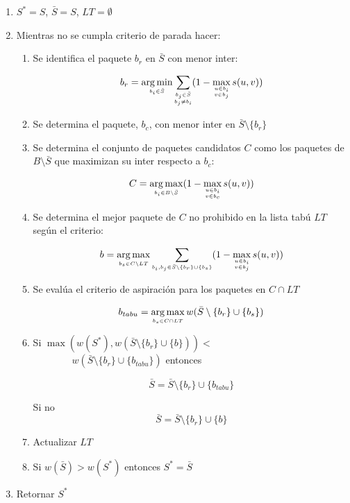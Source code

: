 \begin{enumerate}
\item $S^* = S$, $ \bar{S}= S$, $LT = \emptyset$

\item Mientras no se cumpla criterio de parada hacer:

\begin{enumerate}
      	
\item Se identifica el paquete $b_r$ en $\bar{S}$ con menor inter:

$$b_r = \operatorname*{arg\,min}_{\scriptscriptstyle b_i \in \bar{S}} \sum_{\substack{\scriptscriptstyle  b_j \in \bar{S} \\ \scriptscriptstyle  b_j \ne b_i}} (1-\max_{\substack{\scriptscriptstyle  u\in b_i \\ \scriptscriptstyle v \in b_j}} s(u,v))$$

\item Se determina el paquete, $b_c$, con menor inter en $\bar{S} \setminus \{b_r\}$
	
\item Se determina el conjunto de paquetes candidatos $C$ como los paquetes de $B\setminus \bar{S}$ que maximizan su inter respecto a $b_c$:

$$C = \operatorname*{arg\,max}_{\scriptscriptstyle b_i \in B \setminus \bar{S}} (1-\max_{\substack{\scriptscriptstyle u\in b_i \\ \scriptscriptstyle v \in b_c}} s(u,v))$$

\item Se determina el mejor paquete de $C$ no prohibido en la lista tabú $LT$ según el criterio:

$$b = \operatorname*{arg\,max}_{\scriptscriptstyle b_s \in C \setminus LT} \sum_{\scriptscriptstyle b_i, b_j \in \bar{S}\setminus \{b_r\} \cup \{b_s\}}(1-\max_{\substack{\scriptscriptstyle u\in b_i \\ \scriptscriptstyle v \in b_j}} s(u,v))$$

\item Se evalúa el criterio de aspiración para los paquetes en $C \cap LT$

$$b_{tabu} = \operatorname*{arg\,max}_{\scriptscriptstyle b_s \in C \cap LT} w(\bar{S} \setminus \{b_r\} \cup \{b_s\})$$

\item Si $\max(w(S^*),w(\bar{S} \setminus \{b_r\} \cup \{b\})) < \qquad \qquad$ $\qquad \qquad w(\bar{S} \setminus \{b_r\} \cup \{b_{tabu}\})$ entonces

$$\bar{S} = \bar{S} \setminus \{b_r\} \cup \{b_{tabu}\}$$ 

Si no $$\bar{S} = \bar{S} \setminus \{b_r\} \cup \{b\}$$

\item Actualizar $LT$

\item Si $w(\bar{S})>w(S^*)$ entonces $S^*=\bar{S}$

\end{enumerate}

\item Retornar $S^*$

\end{enumerate}

